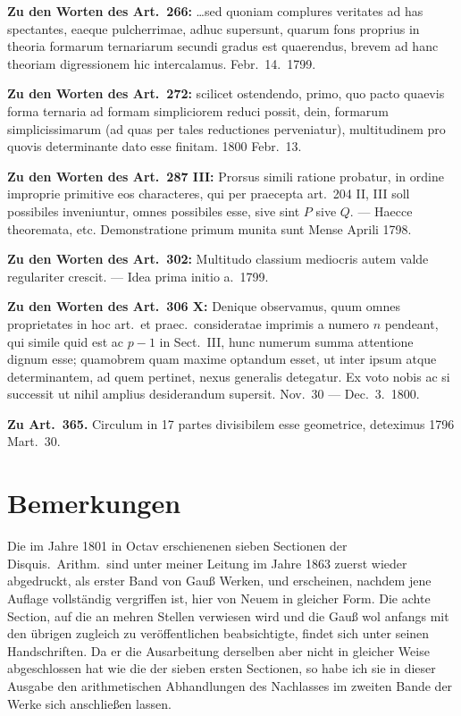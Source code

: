 \documentclass[12pt,a4paper]{article}
\theoremstyle{plain}
\theoremstyle{definition}
\theoremstyle{remark}
\begin{document}
\vspace{0.5em}
\textbf{Zu den Worten des Art.\ 266:} \ldots sed quoniam complures veritates ad has spectantes, eaeque pulcherrimae, adhuc supersunt, quarum fons proprius in theoria formarum ternariarum secundi gradus est quaerendus, brevem ad hanc theoriam digressionem hic intercalamus. Febr.\ 14.\ 1799.

\vspace{0.5em}
\textbf{Zu den Worten des Art.\ 272:} scilicet ostendendo, primo, quo pacto quaevis forma ternaria ad formam simpliciorem reduci possit, dein, formarum simplicissimarum (ad quas per tales reductiones perveniatur), multitudinem pro quovis determinante dato esse finitam. 1800 Febr.\ 13.

\vspace{0.5em}
\textbf{Zu den Worten des Art.\ 287 III:} Prorsus simili ratione probatur, in ordine improprie primitive eos characteres, qui per praecepta art.\ 204 II, III soll possibiles inveniuntur, omnes possibiles esse, sive sint $P$ sive $Q$. --- Haecce theoremata, etc. Demonstratione primum munita sunt Mense Aprili 1798.

\vspace{0.5em}
\textbf{Zu den Worten des Art.\ 302:} Multitudo classium mediocris autem valde regulariter crescit. --- Idea prima initio a.\ 1799.

\vspace{0.5em}
\textbf{Zu den Worten des Art.\ 306 X:} Denique observamus, quum omnes proprietates in hoc art.\ et praec.\ consideratae imprimis a numero $n$ pendeant, qui simile quid est ac $p-1$ in Sect.\ III, hunc numerum summa attentione dignum esse; quamobrem quam maxime optandum esset, ut inter ipsum atque determinantem, ad quem pertinet, nexus generalis detegatur. Ex voto nobis ac si successit ut nihil amplius desiderandum supersit. Nov.\ 30 --- Dec.\ 3.\ 1800.

\vspace{0.5em}
\textbf{Zu Art.\ 365.} Circulum in 17 partes divisibilem esse geometrice, deteximus 1796 Mart.\ 30.


\newpage
\section*{Bemerkungen}

Die im Jahre 1801 in Octav erschienenen sieben Sectionen der Disquis.\ Arithm.\ sind unter meiner Leitung im Jahre 1863 zuerst wieder abgedruckt, als erster Band von Gau\ss{} Werken, und erscheinen, nachdem jene Auflage vollst\"andig vergriffen ist, hier von Neuem in gleicher Form. Die achte Section, auf die an mehren Stellen verwiesen wird und die Gau\ss{} wol anfangs mit den \"ubrigen zugleich zu ver\"offentlichen beabsichtigte, findet sich unter seinen Handschriften. Da er die Ausarbeitung derselben aber nicht in gleicher Weise abgeschlossen hat wie die der sieben ersten Sectionen, so habe ich sie in dieser Ausgabe den arithmetischen Abhandlungen des Nachlasses im zweiten Bande der Werke sich anschlie\ss en lassen.
\end{document}

